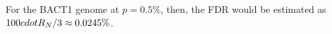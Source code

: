 For the BACT1 genome at $p = 0.5\%$, then,
the FDR would be estimated as $100 \\cdot R_N / 3 \approx 0.0245\%$.
\endinput